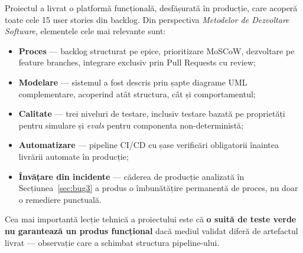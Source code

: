 \documentclass[11pt,a4paper]{article}
\begin{document}
Proiectul a livrat o platformă funcțională, desfășurată în producție, care
acoperă toate cele 15 user stories din backlog. Din perspectiva
\textit{Metodelor de Dezvoltare Software}, elementele cele mai relevante sunt:

\begin{itemize}
  \item \textbf{Proces} --- backlog structurat pe epice, prioritizare MoSCoW,
        dezvoltare pe feature branches, integrare exclusiv prin Pull Requests
        cu review;
  \item \textbf{Modelare} --- sistemul a fost descris prin șapte diagrame UML
        complementare, acoperind atât structura, cât și comportamentul;
  \item \textbf{Calitate} --- trei niveluri de testare, inclusiv testare bazată pe
        proprietăți pentru simulare și \textit{evals} pentru componenta
        non-deterministă;
  \item \textbf{Automatizare} --- pipeline CI/CD cu șase verificări obligatorii
        înaintea livrării automate în producție;
  \item \textbf{Învățare din incidente} --- căderea de producție analizată în
        Secțiunea~\ref{sec:bug3} a produs o îmbunătățire permanentă de proces,
        nu doar o remediere punctuală.
\end{itemize}

Cea mai importantă lecție tehnică a proiectului este că \textbf{o suită de teste
verde nu garantează un produs funcțional} dacă mediul validat diferă de artefactul
livrat --- observație care a schimbat structura pipeline-ului.
\end{document}
